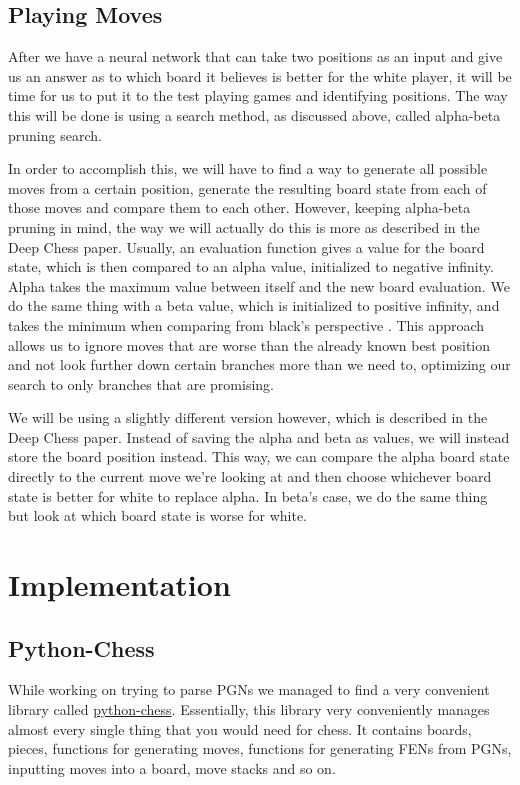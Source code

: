 \documentclass[12pt]{article}
\begin{document}
    \subsection{Playing Moves}

    After we have a neural network that can take two positions as an input and give us an answer as to which board it believes is better for the white player, it will be time for us to put it to the test playing games and identifying positions. The way this will be done is using a search method, as discussed above, called alpha-beta pruning search. 

    In order to accomplish this, we will have to find a way to generate all possible moves from a certain position, generate the resulting board state from each of those moves and compare them to each other. However, keeping alpha-beta pruning in mind, the way we will actually do this is more as described in the Deep Chess paper. Usually, an evaluation function gives a value for the board state, which is then compared to an alpha value, initialized to negative infinity. Alpha takes the maximum value between itself and the new board evaluation. We do the same thing with a beta value, which is initialized to positive infinity, and takes the minimum when comparing from black's perspective \cite{deepchess}. This approach allows us to ignore moves that are worse than the already known best position and not look further down certain branches more than we need to, optimizing our search to only branches that are promising. 

    We will be using a slightly different version however, which is described in the Deep Chess paper. Instead of saving the alpha and beta as values, we will instead store the board position instead. This way, we can compare the alpha board state directly to the current move we're looking at and then choose whichever board state is better for white to replace alpha. In beta's case, we do the same thing but look at which board state is worse for white. 
    
    \section{Implementation}

    \subsection{Python-Chess}

    While working on trying to parse PGNs we managed to find a very convenient library called \href{https://python-chess.readthedocs.io/en/latest/}{python-chess}. Essentially, this library very conveniently manages almost every single thing that you would need for chess. It contains boards, pieces, functions for generating moves, functions for generating FENs from PGNs, inputting moves into a board, move stacks and so on.
\end{document}
